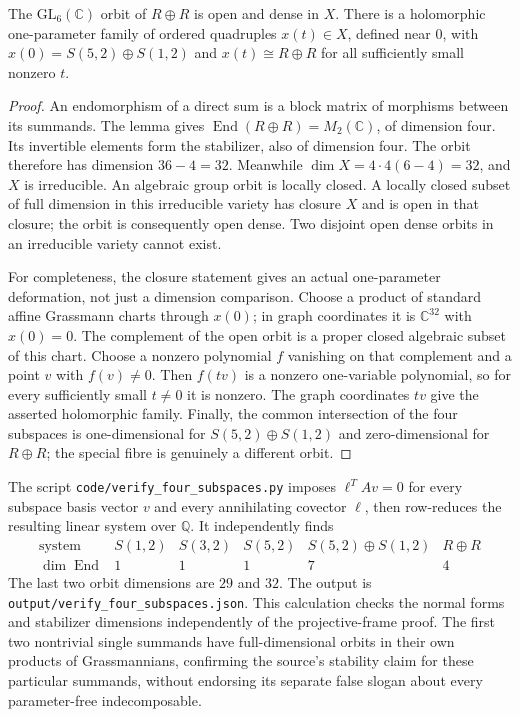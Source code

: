 \begin{theorem}\ours{}
The $\mathrm{GL}_6(\mathbb C)$ orbit of $R\oplus R$ is open and
dense in $X$. There is a holomorphic one-parameter family of ordered
quadruples $x(t)\in X$, defined near $0$, with
$x(0)=S(5,2)\oplus S(1,2)$ and $x(t)\cong R\oplus R$ for all
sufficiently small nonzero $t$.
\end{theorem}

\begin{proof}
An endomorphism of a direct sum is a block matrix of morphisms
between its summands. The lemma gives
$\operatorname{End}(R\oplus R)=M_2(\mathbb C)$, of dimension four.
Its invertible elements form the stabilizer, also of dimension
four. The orbit therefore has dimension $36-4=32$. Meanwhile
$\dim X=4\cdot4(6-4)=32$, and $X$ is irreducible. An algebraic
group orbit is locally closed. A locally closed subset of full
dimension in this irreducible variety has closure $X$ and is open
in that closure; the orbit is consequently open dense. Two
disjoint open dense orbits in an irreducible variety cannot exist.

For completeness, the closure statement gives an actual
one-parameter deformation, not just a dimension comparison.
Choose a product of standard affine Grassmann charts through
$x(0)$; in graph coordinates it is $\mathbb C^{32}$ with $x(0)=0$.
The complement of the open orbit is a proper closed algebraic
subset of this chart. Choose a nonzero polynomial $f$ vanishing
on that complement and a point $v$ with $f(v)\ne0$.
Then $f(tv)$ is a nonzero one-variable polynomial, so for every
sufficiently small $t\ne0$ it is nonzero. The graph coordinates
$tv$ give the asserted holomorphic family. Finally, the common
intersection of the four subspaces is one-dimensional for
$S(5,2)\oplus S(1,2)$ and zero-dimensional for $R\oplus R$;
the special fibre is genuinely a different orbit.
\end{proof}

\begin{example}\oursComputed{}
The script \nolinkurl{code/verify_four_subspaces.py} imposes
$\ell^T A v=0$ for every subspace basis vector $v$ and every
annihilating covector $\ell$, then row-reduces the resulting
linear system over $\mathbb Q$. It independently finds
\[
\begin{array}{c|rrrrr}
\text{system}&S(1,2)&S(3,2)&S(5,2)&S(5,2)\oplus S(1,2)&R\oplus R\\
\hline
\dim\operatorname{End}&1&1&1&7&4
\end{array}
\]
The last two orbit dimensions are $29$ and $32$. The output is
\nolinkurl{output/verify_four_subspaces.json}. This calculation
checks the normal forms and stabilizer dimensions independently
of the projective-frame proof. The first two nontrivial single
summands have full-dimensional orbits in their own products of
Grassmannians, confirming the source's stability claim for these
particular summands, without endorsing its separate false slogan
about every parameter-free indecomposable.
\end{example}

